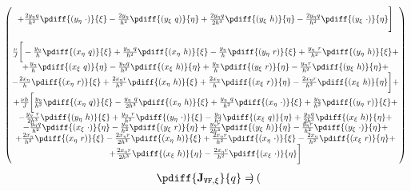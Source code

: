 {{\begin{align}
\begin{pmatrix}
		+ \frac{2 y_{\eta} q }{h^2}  \pdiff{ (y_{\eta}\ \cdot)}{\xi}
		- \frac{2 y_{\eta}}{h^2}  \pdiff{(y_{\xi}\ q)}{\eta}
		+ \frac{2 y_{\eta} q}{2h^3} \pdiff{(y_{\xi}\ h)}{\eta}
		- \frac{2 y_{\eta} q}{h^2} \pdiff{(y_{\xi}\ \cdot)}{\eta}\Bigg]
		\\
		\\
		\frac{\nu}{J} \bigg[
		- \frac{y_{\eta}}{h} \pdiff{(x_{\eta}\ q)}{\xi}
		+ \frac{y_{\eta}\ q }{h^2} \pdiff{(x_{\eta}\ h)}{\xi}
		- \frac{y_{\eta}}{h} \pdiff{(y_{\eta}\ r)}{\xi}
		+ \frac{y_{\eta}\ r }{h^2} \pdiff{(y_{\eta}\ h)}{\xi} + \\
		+ \frac{y_{\eta}}{h}   \pdiff{(x_{\xi}\ q)}{\eta}
		- \frac{y_{\eta}q}{h^2}   \pdiff{(x_{\xi}\ h)}{\eta}
		+ \frac{y_{\eta}}{h} \pdiff{(y_{\xi}\ r)}{\eta}
		- \frac{y_{\eta}r}{h^2} \pdiff{(y_{\xi}\ h)}{\eta} + \\
		- \frac{2 x_{\eta}}{h} \pdiff{(x_{\eta}\ r)}{\xi}
		+ \frac{2 x_{\eta}r}{h^2} \pdiff{(x_{\eta}\  h)}{\xi}
		+ \frac{2 x_{\eta}}{h}  \pdiff{(x_{\xi}\ r)}{\eta}
		- \frac{2 x_{\eta}r}{h^2}  \pdiff{(x_{\xi}\ h)}{\eta}\bigg] + \\
		+ \frac{\nu h}{J} \bigg[
		\frac{y_{\eta}}{h^2} \pdiff{(x_{\eta}\ q)}{\xi}
		- \frac{y_{\eta}\ q }{2h^3} \pdiff{(x_{\eta}\ h)}{\xi}
		+ \frac{y_{\eta}\ q }{h^2} \pdiff{(x_{\eta}\ \cdot)}{\xi}
		+ \frac{y_{\eta}}{h^2} \pdiff{(y_{\eta}\ r)}{\xi} + \\
		- \frac{y_{\eta}\ r }{2h^3} \pdiff{(y_{\eta}\ h)}{\xi}
		+ \frac{y_{\eta}\ r }{h^2} \pdiff{(y_{\eta}\ \cdot)}{\xi}
		- \frac{y_{\eta}}{h^2}   \pdiff{(x_{\xi}\ q)}{\eta}
		+ \frac{y_{\eta}q}{2h^3}   \pdiff{(x_{\xi}\ h)}{\eta} + \\
		- \frac{y_{\eta}q}{h^2}   \pdiff{(x_{\xi}\ \cdot)}{\eta}
		- \frac{y_{\eta}}{h^2} \pdiff{(y_{\xi}\ r)}{\eta}
		+ \frac{y_{\eta}r}{2h^3} \pdiff{(y_{\xi}\ h)}{\eta}
		- \frac{y_{\eta}r}{h^2} \pdiff{(y_{\xi}\ \cdot)}{\eta} + \\
		+ \frac{2 x_{\eta}}{h^2} \pdiff{(x_{\eta}\ r)}{\xi}
		- \frac{2 x_{\eta}r}{2h^3} \pdiff{(x_{\eta}\  h)}{\xi}
		+ \frac{2 x_{\eta}r}{h^2} \pdiff{(x_{\eta}\  \cdot)}{\xi}
		- \frac{2 x_{\eta}}{h^2}  \pdiff{(x_{\xi}\ r)}{\eta} + \\
		+ \frac{2 x_{\eta}r}{2h^3}  \pdiff{(x_{\xi}\ h)}{\eta}
		- \frac{2 x_{\eta}r}{h^2}  \pdiff{(x_{\xi}\ \cdot)}{\eta}\bigg]
\end{pmatrix}
\end{align}
%
\begin{align}
	\pdiff{\mathbf{J}_{\texttt{VF},\xi}}{q}=
		\begin{pmatrix}

\end{pmatrix}
\end{align}}}
